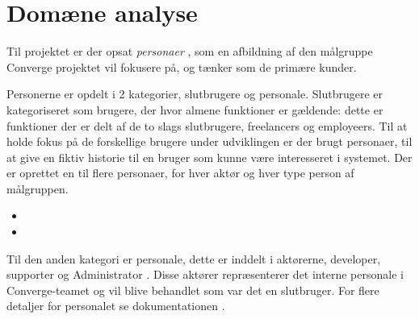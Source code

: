 \section{Domæne analyse}

Til projektet er der opsat \emph{personaer} \cite[Personaer]{converge-terms}, som en afbildning af den målgruppe Converge projektet vil fokusere på, og tænker som de primære kunder.

Personerne er opdelt i 2 kategorier, slutbrugere og personale. Slutbrugere er kategoriseret som brugere, der hvor almene funktioner er gældende: dette er funktioner der er delt af de to slags slutbrugere, freelancers og employeers. Til at holde fokus på de forskellige brugere under udviklingen er der brugt personaer, til at give en fiktiv historie til en bruger som kunne være interesseret i systemet. Der er oprettet en til flere personaer, for hver aktør \cite[Aktør]{converge-terms} og hver type person af målgruppen.

\begin{itemize}
    \item {}
    \item {}
\end{itemize}

Til den anden kategori er personale, dette er inddelt i aktørerne, developer, supporter og Administrator \cite[Personale]{converge-terms}. Disse aktører repræsenterer det interne personale i Converge-teamet og vil blive behandlet som var det en slutbruger. For flere detaljer for personalet se dokumentationen \cite[Funktionelle krav]{documentation-kravspec}. 
